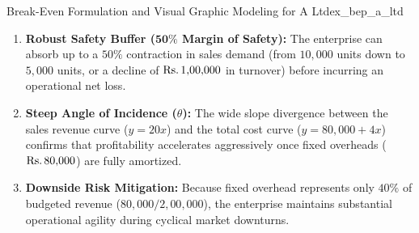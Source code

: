 \begin{example}{Break-Even Formulation and Visual Graphic Modeling for A Ltd}{ex_bep_a_ltd}
\begin{enumerate}[leftmargin=*, topsep=2pt, itemsep=3pt]
    \item \textbf{Robust Safety Buffer ($\mathbf{50\%}$ Margin of Safety):}
    The enterprise can absorb up to a $50\%$ contraction in sales demand (from $10{,}000$ units down to $5{,}000$ units, or a decline of $\text{Rs.}\, 1{,}00{,}000$ in turnover) before incurring an operational net loss.

    \item \textbf{Steep Angle of Incidence ($\theta$):}
    The wide slope divergence between the sales revenue curve ($y = 20x$) and the total cost curve ($y = 80{,}000 + 4x$) confirms that profitability accelerates aggressively once fixed overheads ($\text{Rs.}\, 80{,}000$) are fully amortized.

    \item \textbf{Downside Risk Mitigation:}
    Because fixed overhead represents only $40\%$ of budgeted revenue ($80{,}000 / 2{,}00{,}000$), the enterprise maintains substantial operational agility during cyclical market downturns.
\end{enumerate}
\end{example}


